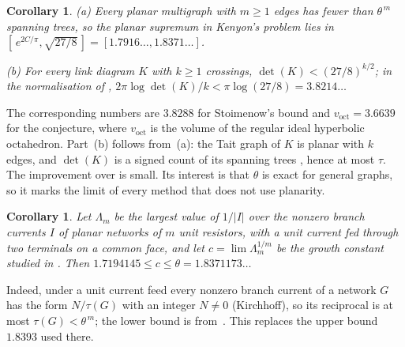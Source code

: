 \documentclass[11pt]{amsart}
\theoremstyle{plain}
\newtheorem{corollary}[theorem]{Corollary}
\theoremstyle{remark}
\newcommand{\tht}{\theta}
\begin{document}
\begin{corollary}\label{cor:planar}
\textup{(a)} Every planar multigraph with $m\ge1$ edges has fewer than $\tht^{\,m}$ spanning trees, so the planar
supremum in Kenyon's problem lies in $[\,e^{2C/\pi},\sqrt{27/8}\,]=[1.7916\ldots,1.8371\ldots]$.

\textup{(b)} For every link diagram $K$ with $k\ge1$ crossings, $\det(K)<(27/8)^{k/2}$; in the normalisation of
\cite{CKP}, $2\pi\log\det(K)/k<\pi\log(27/8)=3.8214\ldots$
\end{corollary}
\noindent The corresponding numbers are $3.8288$ for Stoimenow's bound and $v_{\mathrm{oct}}=3.6639$ for the
conjecture, where $v_{\mathrm{oct}}$ is the volume of the regular ideal hyperbolic octahedron. Part~(b) follows
from~(a): the Tait graph of $K$ is planar with $k$ edges, and $\det(K)$ is a signed count of its spanning trees
\cite[Lemma~2.1]{CKP}, hence at most $\tau$. The improvement over \cite{Stoimenow} is
small. Its interest is that $\tht$ is exact for general graphs, so it marks the limit of every method that does
not use planarity.

\begin{corollary}\label{cor:current}
Let $\Lambda_m$ be the largest value of $1/|I|$ over the nonzero branch currents $I$ of planar networks of $m$ unit
resistors, with a unit current fed through two terminals on a common face, and let $c=\lim\Lambda_m^{1/m}$ be the
growth constant studied in \cite{M2}. Then $1.7194145\le c\le\tht=1.8371173\ldots$
\end{corollary}
\noindent Indeed, under a unit current feed every nonzero branch current of a network $G$ has the form $N/\tau(G)$
with an integer $N\ne0$ (Kirchhoff), so its reciprocal is at most $\tau(G)<\tht^{\,m}$; the lower bound is
from~\cite{M2}. This replaces the upper bound $1.8393$ used there.
\end{document}
